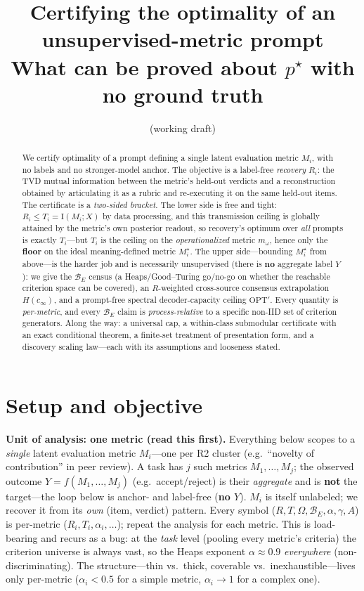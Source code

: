 \documentclass[11pt]{article}
\title{\textbf{Certifying the optimality of an unsupervised-metric prompt}\\[2pt]
\large What can be proved about $p^\star$ with no ground truth}
\author{(working draft)}
\date{}
\newcommand{\Iv}{\mathrm{I}}
\newcommand{\Bset}{\mathcal{B}_E}
\newcommand{\Om}{\Omega}
\newcommand{\Mw}{m_\omega}
\newcommand{\Mstar}{M_i^\star}
\newcommand{\cinf}{c_\infty}
\begin{document}
\maketitle

\begin{abstract}
We certify optimality of a prompt defining a single latent evaluation metric $M_i$, with no labels and no
stronger-model anchor. The objective is a label-free \emph{recovery} $R_i$: the TVD mutual information
between the metric's held-out verdicts and a reconstruction obtained by articulating it as a rubric and
re-executing it on the same held-out items. The certificate is a \emph{two-sided bracket}. The lower side is
free and tight: $R_i\le T_i=\Iv(M_i;X)$ by data processing, and this transmission ceiling is globally
attained by the metric's own posterior readout, so recovery's optimum over \emph{all} prompts is exactly
$T_i$---but $T_i$ is the ceiling on the \emph{operationalized} metric $\Mw$, hence only the \textbf{floor} on
the ideal meaning-defined metric $\Mstar$. The upper side---bounding $\Mstar$ from above---is the harder job
and is necessarily unsupervised (there is \textbf{no} aggregate label $Y$): we give the $\Bset$ census (a
Heaps/Good--Turing go/no-go on whether the reachable criterion space can be covered), an $R$-weighted
cross-source consensus extrapolation $H(\cinf)$, and a prompt-free spectral decoder-capacity ceiling
$\mathrm{OPT}'$. Every quantity is \emph{per-metric}, and every $\Bset$ claim is \emph{process-relative} to a
specific non-IID set of criterion generators. Along the way: a universal cap, a within-class submodular
certificate with an exact conditional theorem, a finite-set treatment of presentation form, and a discovery
scaling law---each with its assumptions and looseness stated.
\end{abstract}

\section{Setup and objective}

\textbf{Unit of analysis: one metric (read this first).} Everything below scopes to a \emph{single} latent
evaluation metric $M_i$---one per R2 cluster (e.g.\ ``novelty of contribution'' in peer review). A task has
$j$ such metrics $M_1,\dots,M_j$; the observed outcome $Y=f(M_1,\dots,M_j)$ (e.g.\ accept/reject) is their
\emph{aggregate} and is \textbf{not} the target---the loop below is anchor- and label-free (\textbf{no $Y$}).
$M_i$ is itself unlabeled; we recover it from its \emph{own} (item, verdict) pattern. Every symbol
($R,T,\Om,\Bset,\alpha,\gamma,A$) is per-metric ($R_i,T_i,\alpha_i,\dots$); repeat the analysis for each
metric. This is load-bearing and recurs as a bug: at the \emph{task} level (pooling every metric's criteria)
the criterion universe is always vast, so the Heaps exponent $\alpha\approx0.9$ \emph{everywhere}
(non-discriminating). The structure---thin vs.\ thick, coverable vs.\ inexhaustible---lives only per-metric
($\alpha_i<0.5$ for a simple metric, $\alpha_i\to1$ for a complex one).
\end{document}
